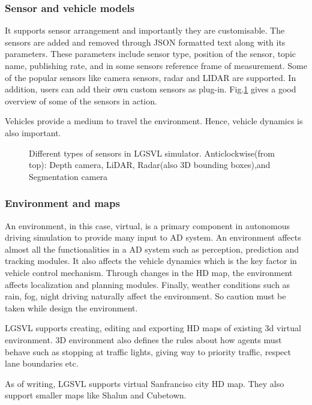 \subsubsection*{Sensor and vehicle models}
It supports sensor arrangement and importantly they are customisable. The sensors are
added and removed through JSON formatted text along with its parameters. These parameters
include sensor type, position of the sensor, topic name, publishing rate, and in some
sensors reference frame of measurement. Some of the popular sensors like camera sensors,
radar and LIDAR are supported. In addition, users can add their own custom sensors as
plug-in. Fig.\ref{fig:sensortypeslgsvlnew} gives a good overview of some of the sensors in action.

Vehicles provide a medium to travel the environment. Hence, vehicle dynamics is also
important.

\begin{figure}[!ht]
    \centering
    \def\svgwidth{0.9\columnwidth}
    
    \caption{Different types of sensors in LGSVL simulator. Anticlockwise(from top): Depth
    camera, LiDAR, Radar(also 3D bounding boxes),and Segmentation camera}
    \label{fig:sensortypeslgsvlnew}
\end{figure}

\subsubsection*{Environment and maps}
An environment, in this case, virtual, is a primary component in autonomous driving
simulation to provide many input to AD system. An environment affects almost all the
functionalities in a AD system such as perception, prediction and tracking modules. It
also affects the vehicle dynamics which is the key factor in vehicle control mechanism.
Through changes in the HD map, the environment affects localization and planning modules.
Finally, weather conditions such as rain, fog, night driving naturally affect the
environment. So caution must be taken while design the environment.

LGSVL supports creating, editing and exporting HD maps of existing 3d virtual environment.
3D environment also defines the rules about how agents must behave such as stopping at traffic
lights, giving way to priority traffic, respect lane boundaries etc.

As of writing, LGSVL supports virtual Sanfranciso city HD map. They also support smaller
maps like Shalun and Cubetown.

